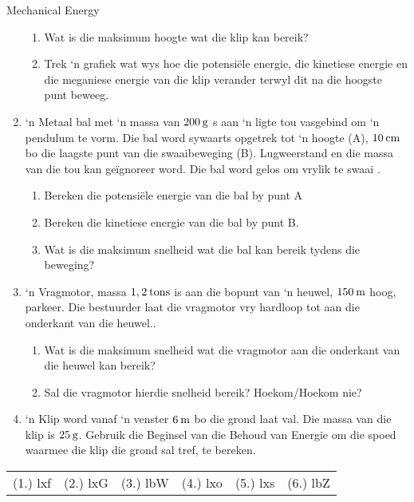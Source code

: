 \begin{eocexercises}{Mechanical Energy}
\begin{enumerate}[noitemsep, label=\textbf{\arabic*}. ]
\label{m38786*id71971}\begin{enumerate}[noitemsep, label=\textbf{\alph*}. ] 
            \label{m38786*uid133}\item Wat is die maksimum hoogte wat die klip kan bereik?
\label{m38786*uid134}\item Trek ‘n grafiek wat wys hoe die potensiële energie, die kinetiese energie en die meganiese energie van die klip verander terwyl dit na die hoogste punt beweeg.
\end{enumerate}
                  \label{m38786*uid135}\item ‘n Metaal bal met ‘n massa van  $200\phantom{\rule{2pt}{0ex}}\text{g}$ s aan ‘n ligte tou vasgebind om ‘n pendulum te vorm. Die bal word sywaarts opgetrek tot ‘n hoogte (A), $10\phantom{\rule{2pt}{0ex}}\text{cm}$ bo die laagste punt van die swaaibeweging (B). Lugweerstand en die massa van die tou kan geïgnoreer word. Die bal word gelos om vrylik te swaai .
\label{m38786*id72026}\begin{enumerate}[noitemsep, label=\textbf{\alph*}. ] 
            \label{m38786*uid136}\item Bereken die potensiële energie van die bal by punt A
\label{m38786*uid137}\item Bereken die kinetiese energie van die bal by punt B.
\label{m38786*uid138}\item Wat is die maksimum snelheid wat die bal kan bereik tydens die beweging?
\end{enumerate}
                \label{m38786*uid139}\item ‘n Vragmotor, massa $1,2\phantom{\rule{2pt}{0ex}}\text{tons}$ is aan die bopunt van ‘n heuwel,  $150\phantom{\rule{2pt}{0ex}}\text{m}$ hoog, parkeer. Die bestuurder laat die vragmotor vry hardloop tot aan die onderkant van die heuwel..
\label{m38786*id72082}\begin{enumerate}[noitemsep, label=\textbf{\alph*}. ] 
            \label{m38786*uid140}\item Wat is die maksimum snelheid wat die vragmotor aan die onderkant van die heuwel kan bereik?
\label{m38786*uid141}\item Sal die vragmotor hierdie snelheid bereik? Hoekom/Hoekom nie?
\end{enumerate}
                \label{m38786*uid142}\item ‘n Klip word vanaf ‘n venster $6\phantom{\rule{2pt}{0ex}}\text{m}$ bo die grond laat val. Die massa van die klip is $25\phantom{\rule{2pt}{0ex}}\text{g}$.
Gebruik die Beginsel van die Behoud van Energie om die spoed waarmee die klip die grond sal tref, te bereken.
           \end{enumerate}
  \label{m38786**end}
  \label{1fc5ba69690764517c30802fdf7b1905**end}
\practiceinfo
 \par \begin{tabular}[h]{cccccc}
 (1.) lxf  &  (2.) lxG  &  (3.) lbW  &  (4.) lxo  &  (5.) lxs  &  (6.) lbZ  & \end{tabular}
\end{eocexercises}
